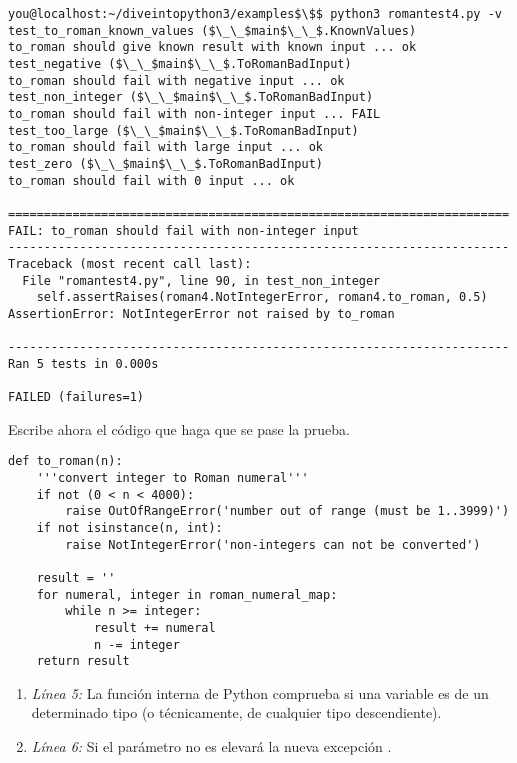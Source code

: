 \noindent\begin{minipage}{\textwidth}
\begin{lstlisting}[mathescape=True]
you@localhost:~/diveintopython3/examples$\$$ python3 romantest4.py -v
test_to_roman_known_values ($\_\_$main$\_\_$.KnownValues)
to_roman should give known result with known input ... ok
test_negative ($\_\_$main$\_\_$.ToRomanBadInput)
to_roman should fail with negative input ... ok
test_non_integer ($\_\_$main$\_\_$.ToRomanBadInput)
to_roman should fail with non-integer input ... FAIL
test_too_large ($\_\_$main$\_\_$.ToRomanBadInput)
to_roman should fail with large input ... ok
test_zero ($\_\_$main$\_\_$.ToRomanBadInput)
to_roman should fail with 0 input ... ok

======================================================================
FAIL: to_roman should fail with non-integer input
----------------------------------------------------------------------
Traceback (most recent call last):
  File "romantest4.py", line 90, in test_non_integer
    self.assertRaises(roman4.NotIntegerError, roman4.to_roman, 0.5)
AssertionError: NotIntegerError not raised by to_roman

----------------------------------------------------------------------
Ran 5 tests in 0.000s

FAILED (failures=1)
\end{lstlisting}
\end{minipage}

Escribe ahora el código que haga que se pase la prueba.

\noindent\begin{minipage}{\textwidth}
\begin{lstlisting}[mathescape=True]
def to_roman(n):
    '''convert integer to Roman numeral'''
    if not (0 < n < 4000):
        raise OutOfRangeError('number out of range (must be 1..3999)')
    if not isinstance(n, int):
        raise NotIntegerError('non-integers can not be converted')

    result = ''
    for numeral, integer in roman_numeral_map:
        while n >= integer:
            result += numeral
            n -= integer
    return result
\end{lstlisting}
\end{minipage}

\begin{enumerate}

\item \emph{Línea 5:} La función interna de Python  comprueba si una variable es de un determinado tipo (o técnicamente, de cualquier tipo descendiente).

\item \emph{Línea 6:} Si el parámetro  no es  elevará la nueva excepción .

\end{enumerate}

